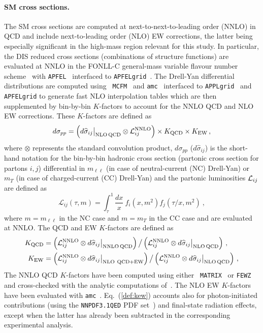 \documentclass[withindex,glossary]{cam-thesis}
\begin{document}
\paragraph{SM cross sections.}
%
The SM cross sections are computed at next-to-next-to-leading order
(NNLO) in QCD and include next-to-leading order (NLO) EW corrections,
the latter being especially significant in the high-mass region relevant for this study.
In particular, the DIS reduced cross sections (combinations of structure functions)
are evaluated at NNLO in the FONLL-C general-mass 
variable flavour number scheme~\cite{Forte_2010} with {\tt APFEL}~\cite{Bertone_2014}
interfaced to {\tt APFELgrid}~\cite{Bertone:2016lga}.
The Drell-Yan differential distributions are computed using {\tt
MCFM}~\cite{Campbell:2019dru} and \texttt{amc}~\cite{Frederix:2018nkq} interfaced to
{\tt APPLgrid}~\cite{Carli:2010rw} and {\tt APFELgrid} to generate fast NLO
interpolation tables which are then supplemented by bin-by-bin $K$-factors to
account for the NNLO QCD and NLO EW corrections.
These $K$-factors are defined as
\begin{equation}
 d\sigma_{pp}= \left(d\widehat\sigma_{ij}\big|_{\rm NLO\, QCD}\otimes {\cal L}^{\rm NNLO}_{ij}\right)\times K_{\rm QCD} \times   K_{\rm EW} \, ,
\end{equation}
where $\otimes$ represents the standard convolution product, $d\sigma_{pp}$ ($d\widehat\sigma_{ij}$) is the short-hand
notation for the bin-by-bin hadronic cross section (partonic cross
section for partons $i,j$) differential in $m_{\ell\ell}$ (in case of neutral-current (NC)
Drell-Yan) or $m_T$ (in case of charged-current (CC) Drell-Yan) and the partonic luminosities ${\cal L}_{ ij}$ are
defined as
\begin{equation}
\mathcal{L}_{ij}(\tau,m) = \int_{\tau}^1 \frac{d x}{x}~f_i (x,m^2) f_j (\tau/x,m^2) ~,
\end{equation}
where $m=m_{\ell\ell}$ in the NC case and $m=m_T$ in the CC case and
are evaluated at NNLO. The QCD and EW $K$-factors are defined as
\begin{align}
  K_{\rm QCD}&= \left( {\cal L}_{
             ij}^{\rm NNLO} \otimes d\widehat\sigma_{ij}\big|_{\rm NNLO\, QCD}\right)
             \big/\left({\cal L}_{
             ij}^{\rm NNLO} \otimes d\widehat\sigma_{ij}\big|_{\rm NLO\, QCD}\right) \, , \label{def:kqcd}\\
K_{\rm EW}&= \left({\cal L}_{ ij}^{\rm NNLO}\otimes
            d\widehat\sigma_{ij}\big|_{\rm NLO~QCD+EW}\right)
            \big/ \left({\cal L}_{ ij}^{\rm NNLO} \otimes d\widehat\sigma_{ij}\big|_{\rm NLO\, QCD} \right) \, , \label{def:kew}
\end{align}
%
The NNLO QCD $K$-factors have been computed using either {\tt
  MATRIX}~\cite{Grazzini_2018} or {\tt FEWZ}~\cite{Li:2012wna}
and cross-checked with the analytic computations of~\cite{Duhr:2020seh,Duhr:2020sdp}.
%
The NLO EW $K$-factors have been evaluated with \texttt{amc}~\cite{Frederix:2018nkq}.
%
Eq.~(\ref{def:kew}) accounts also for photon-initiated contributions
(using the {\tt NNPDF3.1QED} PDF set~\cite{Bertone:2017bme})
and final-state radiation effects, except when the latter
has already been subtracted in the corresponding experimental analysis.
\end{document}
